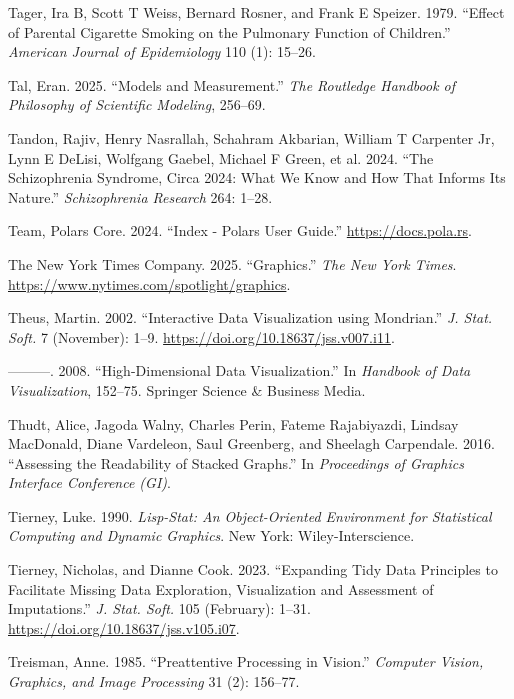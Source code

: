 \documentclass[
]{book}
\newlength{\cslhangindent}
\newenvironment{CSLReferences}[2] %
 {\begin{list}{}{%
  \setlength{\itemindent}{0pt}
  \setlength{\leftmargin}{0pt}
  \setlength{\parsep}{0pt}
  \ifodd #1
   \setlength{\leftmargin}{\cslhangindent}
   \setlength{\itemindent}{-1\cslhangindent}
  \fi
  \setlength{\itemsep}{#2\baselineskip}}}
 {\end{list}}
\theoremstyle{definition}
\theoremstyle{definition}
\theoremstyle{definition}
\theoremstyle{definition}
\theoremstyle{remark}
\begin{document}
\begin{CSLReferences}{1}{0}
Tager, Ira B, Scott T Weiss, Bernard Rosner, and Frank E Speizer. 1979. {``Effect of Parental Cigarette Smoking on the Pulmonary Function of Children.''} \emph{American Journal of Epidemiology} 110 (1): 15--26.

Tal, Eran. 2025. {``Models and Measurement.''} \emph{The Routledge Handbook of Philosophy of Scientific Modeling}, 256--69.

Tandon, Rajiv, Henry Nasrallah, Schahram Akbarian, William T Carpenter Jr, Lynn E DeLisi, Wolfgang Gaebel, Michael F Green, et al. 2024. {``The Schizophrenia Syndrome, Circa 2024: What We Know and How That Informs Its Nature.''} \emph{Schizophrenia Research} 264: 1--28.

Team, Polars Core. 2024. {``Index - Polars User Guide.''} \url{https://docs.pola.rs}.

The New York Times Company. 2025. {``Graphics.''} \emph{The New York Times}. \url{https://www.nytimes.com/spotlight/graphics}.

Theus, Martin. 2002. {``{Interactive Data Visualization using Mondrian}.''} \emph{J. Stat. Soft.} 7 (November): 1--9. \url{https://doi.org/10.18637/jss.v007.i11}.

---------. 2008. {``High-Dimensional Data Visualization.''} In \emph{Handbook of Data Visualization}, 152--75. Springer Science \& Business Media.

Thudt, Alice, Jagoda Walny, Charles Perin, Fateme Rajabiyazdi, Lindsay MacDonald, Diane Vardeleon, Saul Greenberg, and Sheelagh Carpendale. 2016. {``Assessing the Readability of Stacked Graphs.''} In \emph{Proceedings of Graphics Interface Conference (GI)}.

Tierney, Luke. 1990. \emph{Lisp-Stat: An Object-Oriented Environment for Statistical Computing and Dynamic Graphics}. New York: Wiley-Interscience.

Tierney, Nicholas, and Dianne Cook. 2023. {``{Expanding Tidy Data Principles to Facilitate Missing Data Exploration, Visualization and Assessment of Imputations}.''} \emph{J. Stat. Soft.} 105 (February): 1--31. \url{https://doi.org/10.18637/jss.v105.i07}.

Treisman, Anne. 1985. {``Preattentive Processing in Vision.''} \emph{Computer Vision, Graphics, and Image Processing} 31 (2): 156--77.


\end{CSLReferences}
\end{document}
